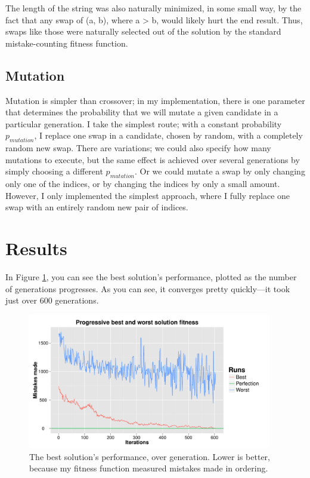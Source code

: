 \documentclass[11pt]{article}
\begin{document}
The length of the string was also naturally minimized, in some small way, by the fact that any swap of (a, b), where a > b, would likely hurt the end result. Thus, swaps like those were naturally selected out of the solution by the standard mistake-counting fitness function.

\subsection{Mutation}
Mutation is simpler than crossover; in my implementation, there is one parameter that determines the probability that we will mutate a given candidate in a particular generation. I take the simplest route; with a constant probability $p_{mutation}$, I replace one swap in a candidate, chosen by random, with a completely random new swap. There are variations; we could also specify how many mutations to execute, but the same effect is achieved over several generations by simply choosing a different $p_{mutation}$. Or we could mutate a swap by only changing only one of the indices, or by changing the indices by only a small amount. However, I only implemented the simplest approach, where I fully replace one swap with an entirely random new pair of indices.

\section{Results}
\label{sec:results}

In Figure \ref{fig:best-solution-performance}, you can see the best solution's performance, plotted as the number of generations progresses. As you can see, it converges pretty quickly---it took just over 600 generations.

\begin{figure}[H]
  \centering
  \includegraphics[width=0.95\textwidth]{results/output-i600-fitness.pdf}
  \caption{The best solution's performance, over generation. Lower is better, because my fitness function measured mistakes made in ordering.}
  \label{fig:best-solution-performance}
\end{figure}
\end{document}
